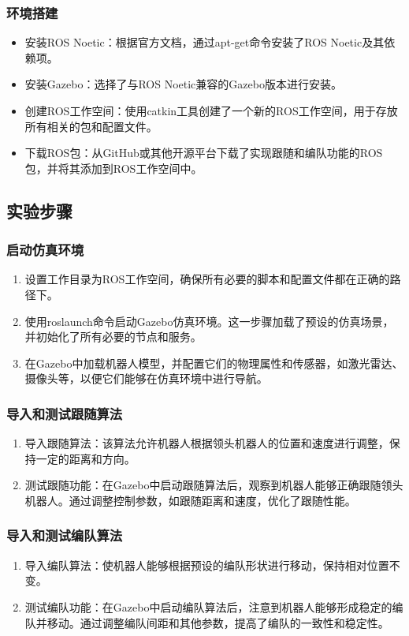 \documentclass[journal,twoside,web]{ieeecolor}
\begin{document}
\subsubsection*{环境搭建}
\begin{itemize}
   \item 安装ROS Noetic：根据官方文档，通过apt-get命令安装了ROS Noetic及其依赖项。
   \item 安装Gazebo：选择了与ROS Noetic兼容的Gazebo版本进行安装。
   \item 创建ROS工作空间：使用catkin工具创建了一个新的ROS工作空间，用于存放所有相关的包和配置文件。
   \item 下载ROS包：从GitHub或其他开源平台下载了实现跟随和编队功能的ROS包，并将其添加到ROS工作空间中。
\end{itemize}
 
\subsection*{实验步骤}
\subsubsection*{启动仿真环境}
\begin{enumerate}
   \item 设置工作目录为ROS工作空间，确保所有必要的脚本和配置文件都在正确的路径下。
   \item 使用roslaunch命令启动Gazebo仿真环境。这一步骤加载了预设的仿真场景，并初始化了所有必要的节点和服务。
   \item 在Gazebo中加载机器人模型，并配置它们的物理属性和传感器，如激光雷达、摄像头等，以便它们能够在仿真环境中进行导航。
\end{enumerate}
 
\subsubsection*{导入和测试跟随算法}
\begin{enumerate}
   \item 导入跟随算法：该算法允许机器人根据领头机器人的位置和速度进行调整，保持一定的距离和方向。
   \item 测试跟随功能：在Gazebo中启动跟随算法后，观察到机器人能够正确跟随领头机器人。通过调整控制参数，如跟随距离和速度，优化了跟随性能。
\end{enumerate}
 
\subsubsection*{导入和测试编队算法}
\begin{enumerate}
   \item 导入编队算法：使机器人能够根据预设的编队形状进行移动，保持相对位置不变。
   \item 测试编队功能：在Gazebo中启动编队算法后，注意到机器人能够形成稳定的编队并移动。通过调整编队间距和其他参数，提高了编队的一致性和稳定性。
\end{enumerate}
 
\end{document}
